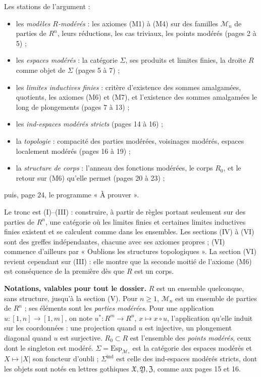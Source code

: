\documentclass[11pt,a4paper]{article}
\begin{document}
Les stations de l'argument :

\begin{itemize}
\item[(I)] les \emph{modèles $R$-modérés} : les axiomes (M1) à (M4) sur des
  familles $\mathcal{M}_n$ de parties de $R^n$, leurs réductions, les cas
  triviaux, les points modérés (pages 2 à 5) ;
\item[(II)] les \emph{espaces modérés} : la catégorie $\Sigma$, ses produits et
  limites finies, la droite $R$ comme objet de $\Sigma$ (pages 5 à 7) ;
\item[(III)] les \emph{limites inductives finies} : critère d'existence des
  sommes amalgamées, quotients, les axiomes (M6) et (M7), et l'existence des
  sommes amalgamées le long de plongements (pages 7 à 13) ;
\item[(IV)] les \emph{ind-espaces modérés stricts} (pages 14 à 16) ;
\item[(V)] la \emph{topologie} : compacité des parties modérées, voisinages
  modérés, espaces localement modérés (pages 16 à 19) ;
\item[(VI)] la \emph{structure de corps} : l'anneau des fonctions modérées, le
  corps $R_0$, et le retour sur (M6) qu'elle permet (pages 20 à 23) ;
\end{itemize}
puis, page 24, le programme « À prouver ».

Le tronc est (I)--(III) : construire, à partir de règles portant seulement sur
des parties de $R^n$, une catégorie où les limites finies et certaines
limites inductives finies existent et se calculent comme dans les ensembles.
Les sections (IV) à (VI) sont des greffes indépendantes, chacune avec ses
axiomes propres ; (VI) commence d'ailleurs par « Oublions les structures
topologiques ». La section (VI) revient cependant sur (III) : elle montre que
la seconde moitié de l'axiome (M6) est conséquence de la première dès que $R$
est un corps.

\textbf{Notations, valables pour tout le dossier.} $R$ est un ensemble
quelconque, sans structure, jusqu'à la section (V). Pour $n \geqslant 1$,
$\mathcal{M}_n$ est un ensemble de parties de $R^n$ ; ses éléments sont les
\emph{parties modérées}. Pour une application $u : [1,n] \to [1,m]$, on note
$u^* : R^m \to R^n$, $x \mapsto x \circ u$, l'application qu'elle induit sur
les coordonnées : une projection quand $u$ est injective, un plongement
diagonal quand $u$ est surjective. $R_0 \subset R$ est l'ensemble des
\emph{points modérés}, ceux dont le singleton est modéré. $\Sigma =
\mathrm{Esp}_{\mathcal{M}_*}$ est la catégorie des espaces modérés et $X
\mapsto |X|$ son foncteur d'oubli ; $\Sigma^{\mathrm{ind}}$ est celle des
ind-espaces modérés stricts, dont les objets sont notés en lettres gothiques
$\mathfrak{X}, \mathfrak{Y}, \mathfrak{Z}$, comme aux pages 15 et 16.
\end{document}

